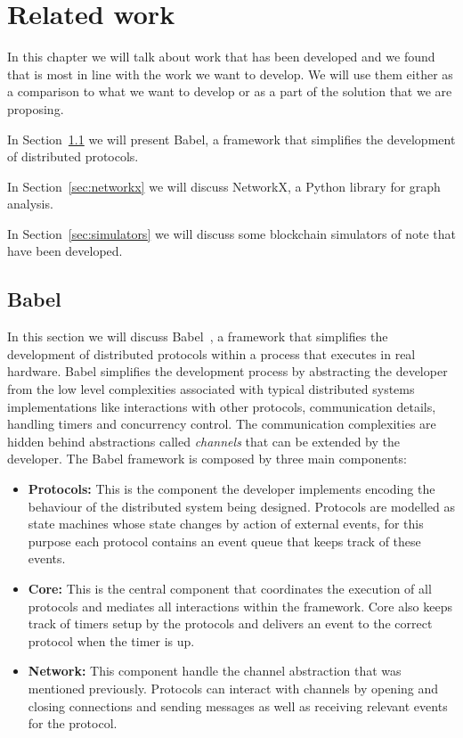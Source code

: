 
%

\chapter{Related work}\label{cha:related_work}

In this chapter we will talk about work that has been developed and we found that is most in line with the
work we want to develop. We will use them
either as a comparison to what we want to develop or as a part of the solution that
we are proposing.

In Section~\ref{sec:babel} we will present Babel, a framework that simplifies
the development of distributed protocols.

In Section~\ref{sec:networkx} we will discuss NetworkX, a Python library
for graph analysis.

In Section~\ref{sec:simulators} we will discuss some blockchain simulators of note that
have been developed.

\section{Babel}\label{sec:babel}

In this section we will discuss Babel~\cite{babel}, a framework that simplifies the
development of distributed protocols within a process that executes in real hardware.
Babel simplifies the development process by abstracting the developer from the
low level complexities associated with typical distributed systems implementations like
interactions with other protocols, communication details, handling timers and concurrency control.
The communication complexities are hidden behind abstractions called \textit{channels}
that can be extended by the developer. The Babel framework is composed by three main components:

\begin{itemize}
  \item \textbf{Protocols:} This is the component the developer implements encoding
the behaviour of the distributed system being designed. Protocols are modelled as
state machines whose state changes by action of external events, for this purpose
each protocol contains an event queue that keeps track of these events.
  \item \textbf{Core:} This is the central component that coordinates the
execution of all protocols and mediates all interactions within the framework.
Core also keeps track of timers setup by the protocols and delivers an event to the
correct protocol when the timer is up.
  \item \textbf{Network:} This component handle the channel abstraction that was
mentioned previously. Protocols can interact with channels by opening and closing connections
and sending messages as well as receiving relevant events for the protocol.
\end{itemize}

